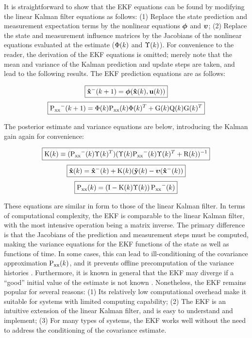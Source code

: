 It is straightforward to show that the EKF equations can be found by modifying the linear Kalman filter equations as follows: (1) Replace the state prediction and measurement expectation terms by the nonlinear equations $\f$ and $\h$; (2) Replace the state and measurement influence matrices by the Jacobians of the nonlinear equations evaluated at the estimate ($\F(k)$ and $\H(k)$).
For convenience to the reader, the derivation of the EKF equations is omitted; merely note that the mean and variance of the Kalman prediction and update steps are taken, and lead to the following results.
The EKF prediction equations are as follows:

\begin{equation}
\boxed{\vecin{\hat{x}^-}{k+1} = \f(\vecin{\hat{x}}{k},\vecin{u}{k})}
\end{equation}
\begin{equation}\boxed{
\P^-(k+1) = \F(k) \P(k) \F(k)^T+ \G(k) \ten{Q}(k) \G(k)^T
}
\end{equation}

The posterior estimate and variance equations are below, introducing the Kalman gain again for convenience:

\begin{equation}
\boxed{
\ten{K}(k) \equiv (\P^-(k) \H(k)^T)(\H(k) \P^-(k) \H(k)^T + \ten{R}(k))^{-1}
}
\end{equation}
\begin{equation}
\boxed{
\vecin{\hat{x}}{k} = \vecin{\hat{x}^-}{k} + \ten{K}(k)(\vecin{\tilde{y}}{k}-\h(\vecin{\hat{x}^-}{k})
}
\end{equation}
\begin{equation}
\boxed{
\P(k) = \left( \ten{\mathrm{I}} - \ten{K}(k)\H(k) \right)\P^-(k)
}
\end{equation}

These equations are similar in form to those of the linear Kalman filter.
In terms of computational complexity, the EKF is comparable to the linear Kalman filter, with the most intensive operation being a matrix inverse.
The primary difference is that the Jacobians of the prediction and measurement steps must be computed, making the variance equations for the EKF functions of the state as well as functions of time.
In some cases, this can lead to ill-conditioning of the covariance approximation $\P(k)$, and it prevents offline precomputation of the variance histories \cite{kay1993}.
Furthermore, it is known in general that the EKF may diverge if a ``good'' initial value of the estimate is not known \cite{wan2000}.
Nonetheless, the EKF remains popular for several reasons: (1) Its relatively low computational overhead make it suitable for systems with limited computing capability; (2) The EKF is an intuitive extension of the linear Kalman filter, and is easy to understand and implement; (3) For many types of systems, the EKF works well without the need to address the conditioning of the covariance estimate.

